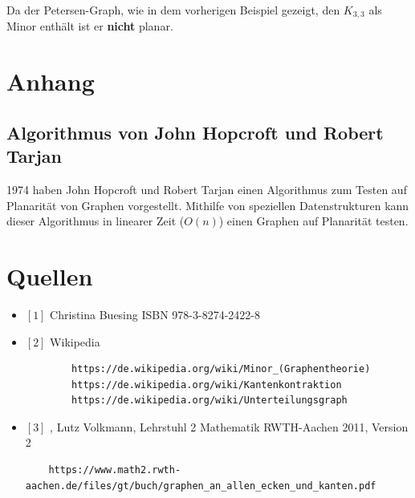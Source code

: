 \documentclass[a4paper]{article}
\begin{document}
Da der Petersen-Graph, wie in dem vorherigen Beispiel gezeigt, den $K_{3,3}$ als Minor enthält ist er \textbf{nicht} planar.


\section{Anhang}

\subsection{Algorithmus von John Hopcroft und Robert Tarjan}
1974 haben John Hopcroft und Robert Tarjan einen Algorithmus zum Testen auf Planarität von Graphen vorgestellt.
Mithilfe von speziellen Datenstrukturen kann dieser Algorithmus in linearer Zeit ($O(n)$) einen Graphen auf Planarität testen.

\section{Quellen}

\begin{itemize}
    \item $[1]$   Christina Buesing ISBN 978-3-8274-2422-8
    \item $[2]$  Wikipedia \begin{verbatim}
        https://de.wikipedia.org/wiki/Minor_(Graphentheorie)
        https://de.wikipedia.org/wiki/Kantenkontraktion
        https://de.wikipedia.org/wiki/Unterteilungsgraph
    \end{verbatim}
    \item $[3]$ ,
Lutz Volkmann,
Lehrstuhl 2 Mathematik RWTH-Aachen 2011,
Version 2
\begin{verbatim}
    https://www.math2.rwth-aachen.de/files/gt/buch/graphen_an_allen_ecken_und_kanten.pdf
\end{verbatim}

\end{itemize}
\end{document}
